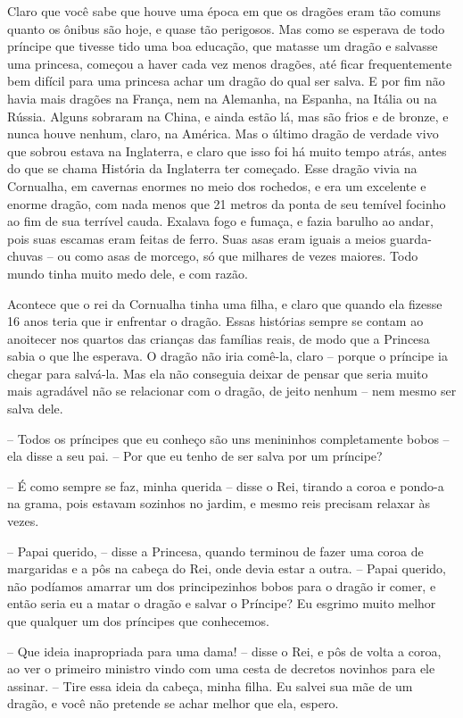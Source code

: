 Claro que você sabe que houve uma época em que os dragões eram tão
comuns quanto os ônibus são hoje, e quase tão perigosos. Mas como se
esperava de todo príncipe que tivesse tido uma boa educação, que
matasse um dragão e salvasse uma princesa, começou a haver cada vez
menos dragões, até ficar frequentemente bem difícil para uma princesa
achar um dragão do qual ser salva. E por fim não havia mais dragões
na França, nem na Alemanha, na Espanha, na Itália ou na Rússia.
Alguns sobraram na China, e ainda estão lá, mas são frios e de
bronze, e nunca houve nenhum, claro, na América. Mas o último dragão
de verdade vivo que sobrou estava na Inglaterra, e claro que isso foi
há muito tempo atrás, antes do que se chama História da Inglaterra
ter começado. Esse dragão vivia na Cornualha, em cavernas enormes no
meio dos rochedos, e era um excelente e enorme dragão, com nada menos
que 21 metros da ponta de seu temível focinho ao fim de sua terrível
cauda. Exalava fogo e fumaça, e fazia barulho ao andar, pois suas
escamas eram feitas de ferro. Suas asas eram iguais a meios
guarda-chuvas -- ou como asas de morcego, só que milhares de vezes
maiores. Todo mundo tinha muito medo dele, e com razão.

Acontece que o rei da Cornualha tinha uma filha, e claro que quando
ela fizesse 16 anos teria que ir enfrentar o dragão. Essas histórias
sempre se contam ao anoitecer nos quartos das crianças das famílias
reais, de modo que a Princesa sabia o que lhe esperava. O dragão não
iria comê-la, claro -- porque o príncipe ia chegar para salvá-la. Mas
ela não conseguia deixar de pensar que seria muito mais agradável não
se relacionar com o dragão, de jeito nenhum -- nem mesmo ser salva
dele.

-- Todos os príncipes que eu conheço são uns menininhos completamente
bobos -- ela disse a seu pai. -- Por que eu tenho de ser salva por um
príncipe?

-- É como sempre se faz, minha querida -- disse o Rei, tirando a coroa e
pondo-a na grama, pois estavam sozinhos no jardim, e mesmo reis
precisam relaxar às vezes.

-- Papai querido, -- disse a Princesa, quando terminou de fazer uma
coroa de margaridas e a pôs na cabeça do Rei, onde devia estar a
outra. -- Papai querido, não podíamos amarrar um dos principezinhos
bobos para o dragão ir comer, e então seria eu a matar o dragão e
salvar o Príncipe? Eu esgrimo muito melhor que qualquer um dos
príncipes que conhecemos. 

-- Que ideia inapropriada para uma dama! -- disse o Rei, e pôs de volta
a coroa, ao ver o primeiro ministro vindo com uma cesta de decretos
novinhos para ele assinar. -- Tire essa ideia da cabeça, minha filha.
Eu salvei sua mãe de um dragão, e você não pretende se achar melhor
que ela, espero.

